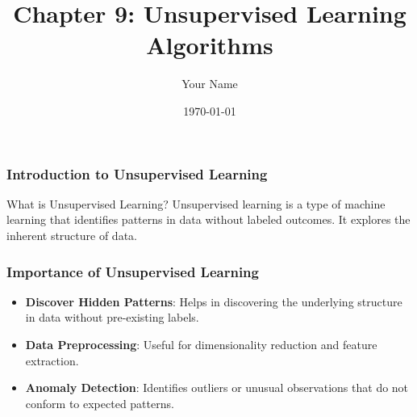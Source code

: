\documentclass{beamer}
\title{Chapter 9: Unsupervised Learning Algorithms}
\author{Your Name}
\institute{Your Institution}
\date{\today}
\begin{document}
\frame{\titlepage}

\begin{frame}[fragile]
    \frametitle{Introduction to Unsupervised Learning}
    \begin{block}{What is Unsupervised Learning?}
        Unsupervised learning is a type of machine learning that identifies patterns in data without labeled outcomes. It explores the inherent structure of data.
    \end{block}
\end{frame}

\begin{frame}[fragile]
    \frametitle{Importance of Unsupervised Learning}
    \begin{itemize}
        \item \textbf{Discover Hidden Patterns}: Helps in discovering the underlying structure in data without pre-existing labels.
        \item \textbf{Data Preprocessing}: Useful for dimensionality reduction and feature extraction.
        \item \textbf{Anomaly Detection}: Identifies outliers or unusual observations that do not conform to expected patterns.
    \end{itemize}
\end{frame}
\end{document}
